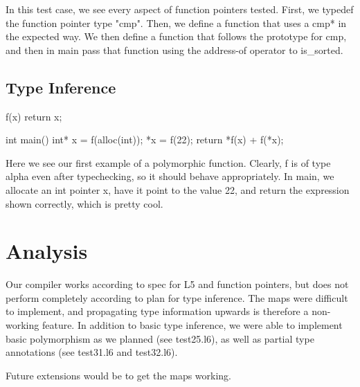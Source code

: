 \documentclass{article}
\begin{document}
In this test case, we see every aspect of function pointers tested. First, we typedef the function pointer type "cmp". Then, we define a function that uses a cmp* in the expected way. We then define a function that follows the prototype for cmp, and then in main pass that function using the address-of operator to is\_sorted. 

\subsection{Type Inference}

f(x){ return x; }

int main() {
  int* x = f(alloc(int));
  *x = f(22);
  return *f(x) + f(*x);
}

Here we see our first example of a polymorphic function. Clearly, f is of type alpha even after typechecking, so it should behave appropriately. In main, we allocate an int pointer x, have it point to the value 22, and return the expression shown correctly, which is pretty cool.



\section{Analysis}

Our compiler works according to spec for L5 and function pointers, but does not perform completely according to plan for type inference. The maps were difficult to implement, and propagating type information upwards is therefore a non-working feature. In addition to basic type inference, we were able to implement basic polymorphism as we planned (see test25.l6), as well as partial type annotations (see test31.l6 and test32.l6).

 Future extensions would be to get the maps working. 
 
\end{document}
